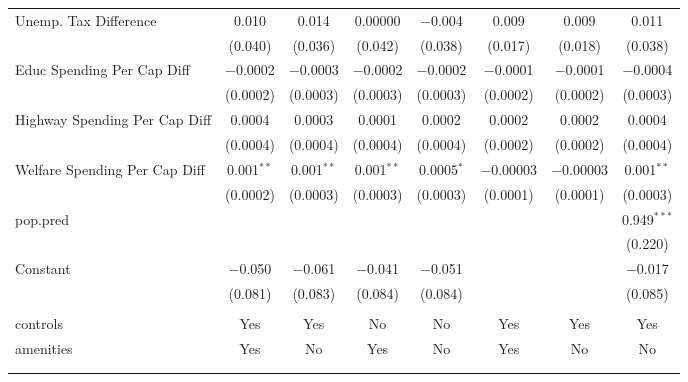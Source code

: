 \begin{table}[!htbp]
\begin{tabular}{@{\extracolsep{5pt}}lccccccc}
  Unemp. Tax Difference & 0.010 & 0.014 & 0.00000 & $-$0.004 & 0.009 & 0.009 & 0.011 \\ 
  & (0.040) & (0.036) & (0.042) & (0.038) & (0.017) & (0.018) & (0.038) \\ 
  Educ Spending Per Cap Diff & $-$0.0002 & $-$0.0003 & $-$0.0002 & $-$0.0002 & $-$0.0001 & $-$0.0001 & $-$0.0004 \\ 
  & (0.0002) & (0.0003) & (0.0003) & (0.0003) & (0.0002) & (0.0002) & (0.0003) \\ 
  Highway Spending Per Cap Diff & 0.0004 & 0.0003 & 0.0001 & 0.0002 & 0.0002 & 0.0002 & 0.0004 \\ 
  & (0.0004) & (0.0004) & (0.0004) & (0.0004) & (0.0002) & (0.0002) & (0.0004) \\ 
  Welfare Spending Per Cap Diff & 0.001$^{**}$ & 0.001$^{**}$ & 0.001$^{**}$ & 0.0005$^{*}$ & $-$0.00003 & $-$0.00003 & 0.001$^{**}$ \\ 
  & (0.0002) & (0.0003) & (0.0003) & (0.0003) & (0.0001) & (0.0001) & (0.0003) \\ 
  pop.pred &  &  &  &  &  &  & 0.949$^{***}$ \\ 
  &  &  &  &  &  &  & (0.220) \\ 
  Constant & $-$0.050 & $-$0.061 & $-$0.041 & $-$0.051 &  &  & $-$0.017 \\ 
  & (0.081) & (0.083) & (0.084) & (0.084) &  &  & (0.085) \\ 
 \hline \\[-1.8ex] 
controls & Yes & Yes & No & No & Yes & Yes & Yes \\ 
amenities & Yes & No & Yes & No & Yes & No & No \\ 
\hline \\[-1.8ex] 
\hline 
\hline \\[-1.8ex] 
\end{tabular} 
\end{table} 
